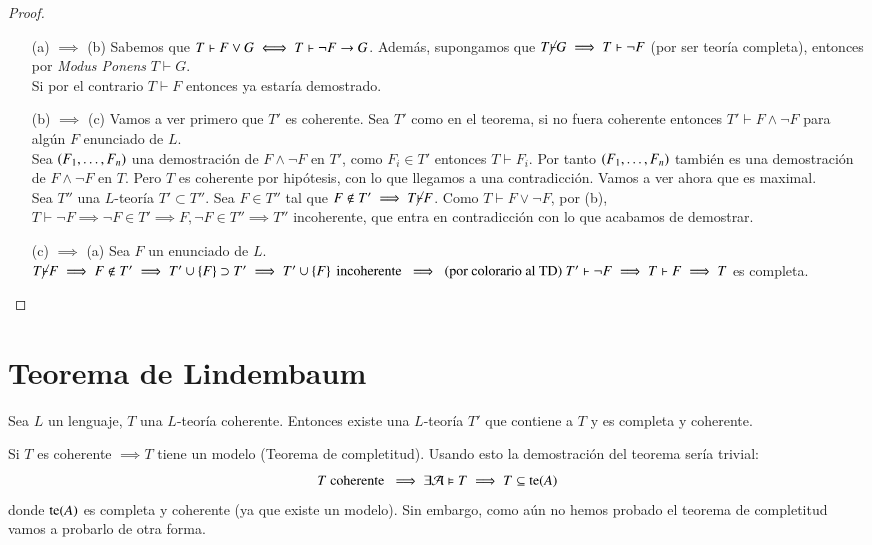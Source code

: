 \begin{proof}$ $
    \begin{enumerate}
        \item[(a) $\implies$ (b)] Sabemos que $T \vdash F \lor G \iff T \vdash \neg F \rightarrow G$. Además, supongamos que $T \cancel\vdash G \implies T \vdash \neg F$ (por ser teoría completa), entonces por \textit{Modus Ponens} $T\vdash G$.\\
        Si por el contrario $T \vdash F$ entonces ya estaría demostrado.
        \item[(b) $\implies$ (c)] Vamos a ver primero que $T'$ es coherente. Sea $T'$ como en el teorema, si no fuera coherente entonces $T' \vdash F \land \neg F$ para algún $F$ enunciado de $L$.\\
        Sea $({F}_{1}, \ldots, {F}_{n})$ una demostración de $F \land \neg F$ en $T'$, como $F_i \in T'$ entonces $T \vdash F_i$. Por tanto $({F}_{1}, \ldots, {F}_{n})$ también es una demostración de $F \land \neg F$ en $T$.
        Pero $T$ es coherente por hipótesis, con lo que llegamos a una contradicción. Vamos a ver ahora que es maximal.\\

        Sea $T''$ una $L$-teoría $T' \subset T''$. Sea $F \in T''$ tal que $F \notin T' \implies T \cancel\vdash F$. Como $T \vdash F \lor \neg F$, por (b), $T \vdash \neg F \implies \neg F \in T' \implies F,\neg F \in T'' \implies T''$ incoherente, que entra en contradicción con lo que acabamos de demostrar.

        \item[(c) $\implies$ (a)]
        Sea $F$ un enunciado de $L$. $T \cancel\vdash F \implies F \notin T' \implies T' \cup \left\{F\right\} \supset T' \implies T' \cup \left\{F\right\} \text{ incoherente } \implies \text{ (por colorario al TD) } T' \vdash \neg F \implies T \vdash F \implies T$ es completa.
    \end{enumerate}
\end{proof}

\section{Teorema de Lindembaum}

\begin{thm}\label{thm:lindembaun}
    Sea $L$ un lenguaje, $T$ una $L$-teoría coherente. Entonces existe una $L$-teoría $T'$ que contiene a $T$ y es completa y coherente.
\end{thm}
\begin{obs}
    Si $T$ es coherente $\implies T$ tiene un modelo (Teorema de completitud). Usando esto la demostración del teorema sería trivial:
    $$
        T \text{ coherente } \implies \exists \mathcal{A} \vDash T \implies T \subseteq \mathrm{te}(A)
    $$
    donde $\mathrm{te}(A)$ es completa y coherente (ya que existe un modelo). Sin embargo, como aún no hemos probado el teorema de completitud vamos a probarlo de otra forma.
\end{obs}

